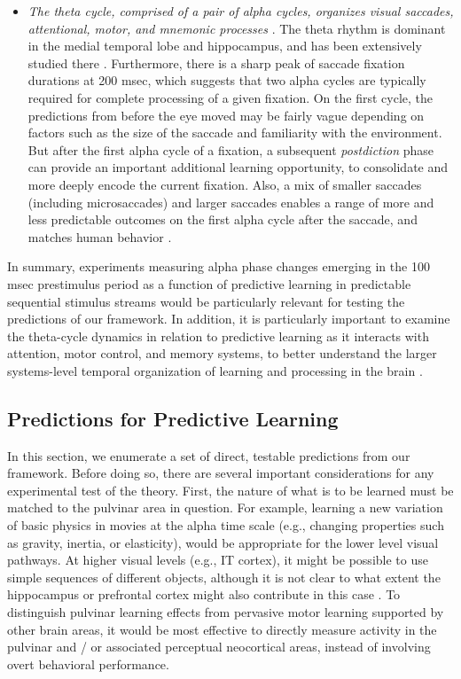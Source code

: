 \documentclass[11pt,twoside]{article}
\newif\myifpdf
\begin{document}
\begin{itemize}
	\item \emph{The theta cycle, comprised of a pair of alpha cycles, organizes visual saccades, attentional, motor, and mnemonic processes} \citep{FiebelkornKastner19}.  The theta rhythm is dominant in the medial temporal lobe and hippocampus, and has been extensively studied there \citep{KahanaSeeligMadsen01,Buzsaki05}.  Furthermore, there is a  sharp peak of saccade fixation durations at 200 msec, which suggests that two alpha cycles are typically required for  complete processing of a given fixation.  On the first cycle, the predictions from before the eye moved may be fairly vague depending on factors such as the size of the saccade and familiarity with the environment.  But after the first alpha cycle of a fixation, a subsequent \emph{postdiction} phase can provide an important additional learning opportunity, to consolidate and more deeply encode the current fixation.  Also, a mix of smaller saccades (including microsaccades) and larger saccades enables a range of more and less predictable outcomes on the first alpha cycle after the saccade, and matches human behavior \citep{Martinez-CondeOtero-MillanMacknik13,Martinez-CondeMacknikHubel04}.
	
\end{itemize}

In summary, experiments measuring alpha phase changes emerging in the 100 msec prestimulus period as a function of predictive learning in predictable sequential stimulus streams would be particularly relevant for testing the predictions of our framework.  In addition, it is particularly important to examine the theta-cycle dynamics in relation to predictive learning as it interacts with attention, motor control, and memory systems, to better understand the larger systems-level temporal organization of learning and processing in the brain \citep{FiebelkornKastner19}.

\subsection{Predictions for Predictive Learning}

In this section, we enumerate a set of direct, testable predictions from our framework.  Before doing so, there are several important considerations for any experimental test of the theory.  First, the nature of what is to be learned must be matched to the pulvinar area in question.  For example, learning a new variation of basic physics in movies at the alpha time scale (e.g., changing properties such as gravity, inertia, or elasticity), would be appropriate for the lower level visual pathways.  At higher visual levels (e.g., IT cortex), it might be possible to use simple sequences of different objects, although it is not clear to what extent the hippocampus or prefrontal cortex might also contribute in this case \citep{GavornikBear14,FiserMahringerOyiboEtAl16}.  To distinguish pulvinar learning effects from pervasive motor learning supported by other brain areas, it would be most effective to directly measure activity in the pulvinar and / or associated perceptual neocortical areas, instead of involving overt behavioral performance. 
\end{document}

